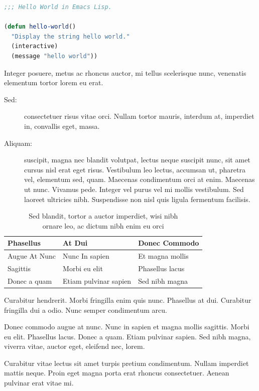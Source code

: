 \documentclass[cfonts]{nostarch}
\begin{document}
\begin{lstlisting}[language=Lisp, frame=single, float,
  caption={[Hello, World in Emacs
  Lisp]Hello, World in Emacs Lisp%
    \index{Lisp|see{programming languages}}%
    \index{programming languages!Lisp}\index{Emacs}}] 
;;; Hello World in Emacs Lisp.

(defun hello-world()
  "Display the string hello world."
  (interactive)
  (message "hello world"))
\end{lstlisting}

Integer posuere, metus ac rhoncus auctor, mi tellus scelerisque
nunc, venenatis elementum tortor lorem eu erat.
\begin{description}
\item[Sed:] consectetuer risus vitae orci. Nullam tortor
  mauris, interdum at, imperdiet in, convallis eget, massa.
\item[Aliquam:] suscipit, magna nec blandit volutpat, lectus neque
  suscipit nunc, sit amet cursus nisl erat eget risus.
  Vestibulum leo lectus, accumsan ut, pharetra vel, elementum sed,
  quam. Maecenas condimentum orci at enim. Maecenas ut
  nunc. Vivamus pede. Integer vel purus vel mi mollis
  vestibulum. Sed laoreet ultricies nibh.  Suspendisse non nisl quis
  ligula fermentum facilisis.
\end{description}
\lipsum[37]


\begin{table}[tp]
  \caption[Sed blandit, tortor a auctor]{Sed blandit, tortor a auctor
    imperdiet, wisi nibh\\ ornare leo, 
    ac dictum nibh enim eu orci}
  \tbfont
  \begin{tabular}{@{}lll}
    \toprule\let\normalfont=\bfseries%
    \thfont Phasellus &  \thfont At Dui       & \thfont Donec Commodo \\
    \midrule    
     Augue At Nunc    & Nunc In  sapien       & Et magna mollis \\
     Sagittis         &  Morbi eu elit        &  Phasellus lacus\\
     Donec a quam     & Etiam pulvinar sapien & Sed nibh magna\\
    \bottomrule
  \end{tabular}
\label{tab:one}
\end{table}

\lipsum[60]

Curabitur hendrerit. Morbi fringilla enim quis nunc.
Phasellus at dui. Curabitur fringilla dui a odio.  Nunc
semper condimentum arcu.
\begin{note}
  Donec commodo augue at nunc. Nunc in
  sapien et magna mollis sagittis. Morbi eu elit.
  Phasellus lacus.  Donec a quam. Etiam pulvinar sapien.
  Sed nibh magna, viverra vitae, auctor eget, eleifend
  nec, lorem.
\end{note}
Curabitur vitae lectus sit amet turpis pretium
condimentum. Nullam imperdiet mattis neque. Proin eget magna porta
erat rhoncus consectetuer. Aenean pulvinar erat vitae mi.
\end{document}
